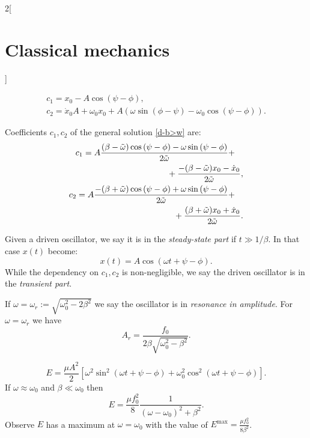 \documentclass[class=article,10pt,crop=false]{standalone}
\begin{document}
\begin{multicols}{2}[\section{Classical mechanics}]
\begin{concept}
\begin{gather*}
    c_1=x_0-A\cos\left(\psi-\phi\right),\\
	c_2=\dot{x}_0A+\omega_0x_0+A\left(\omega\sin\left(\phi-\psi\right)-\omega_0\cos\left(\psi-\phi\right)\right).
\end{gather*}
\end{concept}
\begin{concept}
Coefficients $c_1,c_2$ of the general solution \eqref{d-b>w} are:
\begin{equation*}
    \begin{split}
        \begin{multlined}[t]
        c_1=A\frac{(\beta-\Tilde{\omega})\cos\left(\psi-\phi\right)-\omega\sin\left(\psi-\phi\right)}{2\Tilde{\omega}}+\\+\frac{-(\beta-\Tilde{\omega})x_0-\dot{x}_0}{2\Tilde{\omega}},
        \end{multlined}\\
        \begin{multlined}[t]
        c_2=A\frac{-(\beta+\Tilde{\omega})\cos\left(\psi-\phi\right)+\omega\sin\left(\psi-\phi\right)}{2\Tilde{\omega}}+\\+\frac{(\beta+\Tilde{\omega})x_0+\dot{x}_0}{2\Tilde{\omega}}.
        \end{multlined}
    \end{split}
\end{equation*}
\end{concept}
\begin{definition}
Given a driven oscillator, we say it is in the \textit{steady-state part} if $t\gg 1/\beta$. In that case $x(t)$ become: $$x(t)=A\cos(\omega t+\psi-\phi).$$ While the dependency on $c_1,c_2$ is non-negligible, we say the driven oscillator is in the \textit{transient part}.
\end{definition}
\begin{concept}
If $\omega=\omega_r:=\sqrt{\omega_0^2-2\beta^2}$ we say the oscillator is in \textit{resonance in amplitude}. For $\omega=\omega_r$ we have $$A_r=\frac{f_0}{2\beta\sqrt{\omega_0^2-\beta^2}}.$$
\end{concept}
\begin{concept}
$$E=\frac{\mu A^2}{2}\left[\omega^2\sin^2(\omega t+\psi-\phi)+\omega_0^2\cos^2(\omega t+\psi-\phi)\right].$$ If $\omega\approx\omega_0$ and $\beta\ll\omega_0$ then $$E=\frac{\mu f_0^2}{8}\frac{1}{(\omega-\omega_0)^2+\beta^2}.$$ Observe $E$ has a maximum at $\omega=\omega_0$ with the value of $E^\text{max}=\frac{\mu f_0^2}{8\beta^2}$.

\end{concept}
\end{multicols}
\end{document}
